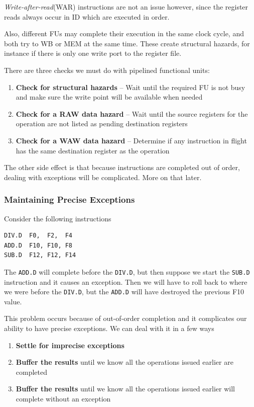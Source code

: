 \documentclass{article}
\begin{document}
\textit{Write-after-read}(WAR) instructions are not an issue however, since the register reads always occur in ID which are executed in order.

Also, different FUs may complete their execution in the same clock cycle, and both try to WB or MEM at the same time. These create structural hazards, for instance if there is only one write port to the register file.


There are three checks we must do with pipelined functional units:

\begin{enumerate}
\item \textbf{Check for structural hazards} -- Wait until the required FU is not busy and make sure the write point will be available when needed

\item \textbf{Check for a RAW data hazard} -- Wait until the source registers for the operation are not listed as pending destination registers

\item \textbf{Check for a WAW data hazard} -- Determine if any instruction in flight has the same destination register as the operation
\end{enumerate}

The other side effect is that because instructions are completed out of order, dealing with exceptions will be complicated. More on that later.

\subsubsection{Maintaining Precise Exceptions}

Consider the following instructions

\begin{verbatim}
DIV.D  F0,  F2,  F4
ADD.D  F10, F10, F8
SUB.D  F12, F12, F14
\end{verbatim}

The \texttt{ADD.D} will complete before the \texttt{DIV.D}, but then suppose we start the \texttt{SUB.D} instruction and it causes an exception. Then we will have to roll back to where we were before the \texttt{DIV.D}, but the \texttt{ADD.D} will have destroyed the previous F10 value. 

This problem occurs because of out-of-order completion and it complicates our ability to have precise exceptions. We can deal with it in a few ways

\begin{enumerate}
\item \textbf{Settle for imprecise exceptions}

\item \textbf{Buffer the results} until we know all the operations issued earlier are completed

\item \textbf{Buffer the results} until we know all the operations issued earlier will complete without an exception
\end{enumerate}
\end{document}

